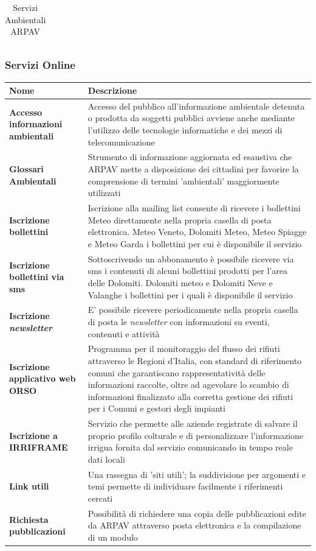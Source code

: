 \begin{longtable}{ p{} | p{} | p{}}
\caption{Servizi Ambientali ARPAV}
\end{longtable}

\subsubsection{Servizi Online}

\begin{longtable}{p{}|p{}}
\textbf{Nome} & \textbf{Descrizione} \\
\endhead

\midrule
\textbf{{\color{Plum} Accesso informazioni ambientali}} & Accesso del pubblico all'informazione ambientale detenuta o prodotta da soggetti pubblici avviene anche mediante l'utilizzo delle tecnologie informatiche e dei mezzi di telecomunicazione \\
\midrule
\textbf{{\color{Plum} Glossari Ambientali}} & Strumento di informazione aggiornata ed esaustiva che ARPAV mette a disposizione dei cittadini per favorire la comprensione di termini 'ambientali' maggiormente utilizzati \\
\midrule
\textbf{{\color{Plum} Iscrizione bollettini}} & Iscrizione alla mailing list consente di ricevere i bollettini Meteo direttamente nella propria casella di posta elettronica. Meteo Veneto, Dolomiti Meteo, Meteo Spiagge e Meteo Garda i bollettini per cui è disponibile il servizio \\
\midrule
\textbf{{\color{Plum} Iscrizione bollettini via sms}} & Sottoscrivendo un abbonamento è possibile ricevere via sms i contenuti di alcuni bollettini prodotti per l'area delle Dolomiti. Dolomiti meteo e Dolomiti Neve e Valanghe i bollettini per i quali è disponibile il servizio \\
\midrule
\textbf{{\color{Plum} Iscrizione \textit{newsletter}}} &  E' possibile ricevere periodicamente nella propria casella di posta le \textit{newsletter} con informazioni su eventi, contenuti e attività \\
\midrule
\textbf{{\color{Plum} Iscrizione applicativo web ORSO }} &  Programma per il monitoraggio del flusso dei rifiuti attraverso le Regioni d'Italia, con standard di riferimento comuni che garantiscano rappresentatività delle informazioni raccolte, oltre ad agevolare lo scambio di informazioni finalizzato alla corretta gestione dei rifiuti per i Comuni e gestori degli impianti \\
\midrule
\textbf{{\color{Plum} Iscrizione a IRRIFRAME}} & Servizio che permette alle aziende registrate di salvare il proprio profilo colturale e di personalizzare l'informazione irrigua fornita dal servizio comunicando in tempo reale dati locali \\
\midrule
\textbf{{\color{Plum} Link utili}} & Una rassegna di 'siti utili'; la suddivisione per argomenti e temi permette di individuare facilmente i riferimenti cercati \\
\midrule
\textbf{{\color{Plum} Richiesta pubblicazioni}} & Possibilità di richiedere una copia delle pubblicazioni edite da ARPAV attraverso posta elettronica e la compilazione di un modulo \\
\bottomrule


\end{longtable}

